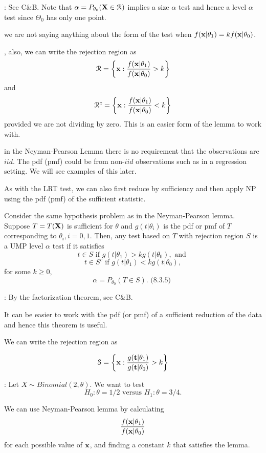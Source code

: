 \documentclass[11pt,]{article}
\def\bt{{\bf t}}
\def\bx{{\bf x}}
\def\bX{{\bf X}}
\def\Rsc{{\cal R}}
\def\Ssc{{\cal S}}
\begin{document}
: See C\&B. Note that
\(\alpha = P_{\theta_0} (\bX \in \Rsc)\) implies a size \(\alpha\) test
and hence a level \(\alpha\) test since \(\Theta_0\) has only one point.

 we are not saying anything about the form of the
test when \(f(\bx|\theta_1) = k f(\bx| \theta_0)\).

, also, we can write the rejection region as
\[\Rsc = \left\{ \bx: \frac{f(\bx | \theta_1)}{f(\bx | \theta_0)} > k\right\}\]
and
\[\Rsc^c = \left\{ \bx: \frac{f(\bx | \theta_1)}{f(\bx | \theta_0)} < k\right\}\]
provided we are not dividing by zero. This is an easier form of the
lemma to work with.

 in the Neyman-Pearson Lemma there is no requirement
that the observations are \(iid\). The pdf (pmf) could be from
non-\(iid\) observations such as in a regression setting. We will see
examples of this later.

As with the LRT test, we can also first reduce by sufficiency and then
apply NP using the pdf (pmf) of the sufficient statistic.

 Consider the same hypothesis problem
as in the Neyman-Pearson lemma. Suppose \(T = T(\bX)\) is sufficient for
\(\theta\) and \(g(t|\theta_i)\) is the pdf or pmf of \(T\)
corresponding to \(\theta_i, i = 0,1\). Then, any test based on \(T\)
with rejection region \(S\) is a UMP level \(\alpha\) test if it
satisfies
\[t \in S \mbox{ if } g(t|\theta_1) > k g(t | \theta_0), \mbox{ and }\]
\[t \in S^c \mbox{ if } g(t|\theta_1) < k g(t | \theta_0),\] for some
\(k\geq 0\), \[\alpha = P_{\theta_0}(T\in S). \mbox{ (8.3.5) }\]

: By the factorization theorem, see C\&B.

It can be easier to work with the pdf (or pmf) of a sufficient reduction
of the data and hence this theorem is useful.

We can write the rejection region as

\[\Ssc = \left\{ \bx: \frac{g(\bt | \theta_1)}{g(\bt | \theta_0)} > k\right\}\]

: Let
\(X \sim Binomial(2,\theta)\). We want to test
\[H_0:  \theta = 1/2 \mbox{ versus } H_1: \theta = 3/4.\]

We can use Neyman-Pearson lemma by calculating
\[\frac{f(\bx | \theta_1)}{f(\bx | \theta_0)} \] for each possible value
of \(\bx\), and finding a constant \(k\) that satisfies the lemma.
\end{document}
